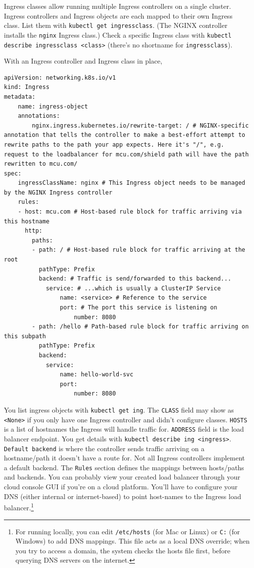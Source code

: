 \documentclass[table, xcdraw]{article}%
\begin{document}
Ingress classes allow running multiple Ingress controllers on a single cluster. Ingress controllers and Ingress objects are each mapped to their own Ingress class. List them with \texttt{kubectl get ingressclass}. (The NGINX controller installs the \texttt{nginx} Ingress class.) Check a specific Ingress class with \texttt{kubectl describe ingressclass <class>} (there's no shortname for \texttt{ingressclass}).

With an Ingress controller and Ingress class in place, 

\begin{verbatim}
apiVersion: networking.k8s.io/v1
kind: Ingress
metadata:
    name: ingress-object
    annotations:
        nginx.ingress.kubernetes.io/rewrite-target: / # NGINX-specific annotation that tells the controller to make a best-effort attempt to rewrite paths to the path your app expects. Here it's "/", e.g. request to the loadbalancer for mcu.com/shield path will have the path rewritten to mcu.com/
spec:
    ingressClassName: nginx # This Ingress object needs to be managed by the NGINX Ingress controller 
    rules:
    - host: mcu.com # Host-based rule block for traffic arriving via this hostname
      http:
        paths:
        - path: / # Host-based rule block for traffic arriving at the root
          pathType: Prefix
          backend: # Traffic is send/forwarded to this backend...
            service: # ...which is usually a ClusterIP Service
                name: <service> # Reference to the service
                port: # The port this service is listening on
                    number: 8080
        - path: /hello # Path-based rule block for traffic arriving on this subpath
          pathType: Prefix
          backend:
            service:
                name: hello-world-svc
                port:
                    number: 8080
\end{verbatim}

You list ingress objects with \texttt{kubectl get ing}. The \texttt{CLASS} field may show as \texttt{<None>} if you only have one Ingress controller and didn’t configure classes. \texttt{HOSTS} is a list of hostnames the Ingress will handle traffic for. \texttt{ADDRESS} field is the load balancer endpoint. You get details with \texttt{kubectl describe ing <ingress>}. \texttt{Default backend} is where the controller sends traffic arriving on a hostname/path it doesn’t have a route for. Not all Ingress controllers implement a default backend. The \texttt{Rules} section defines the mappings between hosts/paths and backends. You can probably view your created load balancer through your cloud console GUI if you’re on a cloud platform. You’ll have to configure your DNS (either internal or internet-based) to point host-names to the Ingress load balancer.\footnote{For running locally, you can edit \texttt{/etc/hosts} (for Mac or Linux) or \texttt{C:\Windows{}\drivers\etc\hosts} (for Windows) to add DNS mappings. This file acts as a local DNS override; when you try to access a domain, the system checks the hosts file first, before querying DNS servers on the internet.}
\end{document}
